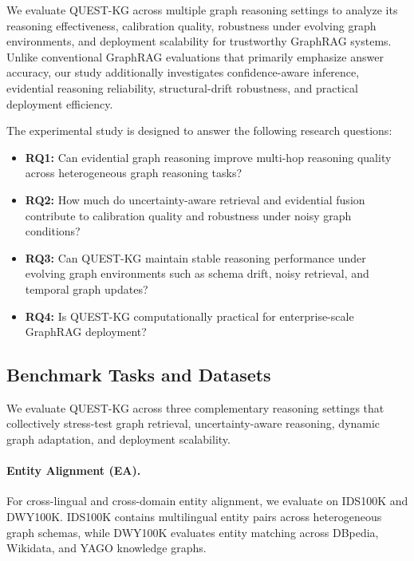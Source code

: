 \documentclass[sigconf,review,anonymous]{acmart}
\begin{document}
We evaluate QUEST-KG across multiple graph reasoning settings to analyze its reasoning effectiveness, calibration quality, robustness under evolving graph environments, and deployment scalability for trustworthy GraphRAG systems. Unlike conventional GraphRAG evaluations that primarily emphasize answer accuracy, our study additionally investigates confidence-aware inference, evidential reasoning reliability, structural-drift robustness, and practical deployment efficiency.

The experimental study is designed to answer the following research questions:

\begin{itemize}
    \item \textbf{RQ1:} Can evidential graph reasoning improve multi-hop reasoning quality across heterogeneous graph reasoning tasks?

    \item \textbf{RQ2:} How much do uncertainty-aware retrieval and evidential fusion contribute to calibration quality and robustness under noisy graph conditions?

    \item \textbf{RQ3:} Can QUEST-KG maintain stable reasoning performance under evolving graph environments such as schema drift, noisy retrieval, and temporal graph updates?

    \item \textbf{RQ4:} Is QUEST-KG computationally practical for enterprise-scale GraphRAG deployment?
\end{itemize}

\subsection{Benchmark Tasks and Datasets}

We evaluate QUEST-KG across three complementary reasoning settings that collectively stress-test graph retrieval, uncertainty-aware reasoning, dynamic graph adaptation, and deployment scalability.

\paragraph{Entity Alignment (EA).}
For cross-lingual and cross-domain entity alignment, we evaluate on IDS100K and DWY100K. IDS100K contains multilingual entity pairs across heterogeneous graph schemas, while DWY100K evaluates entity matching across DBpedia, Wikidata, and YAGO knowledge graphs.
\end{document}
